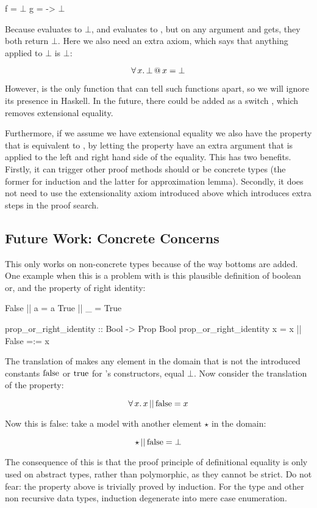 \begin{code}[mathescape]
f = $\bot$
g = \x -> $\bot$
\end{code}

Because  evaluates to $\bot$, and  evaluates
to \hs{()}, but on any argument  and  gets, they both
return $\bot$. Here we also need an extra axiom, which says that
anything applied to $\bot$ is $\bot$:

\begin{equation*}
\forall \, x . \, \bot \, @ \, x = \bot
\end{equation*}

However,  is the only function that can tell such functions
apart, so we will ignore its presence in Haskell.  In the future,
there could be added as a switch , which removes
extensional equality.

Furthermore, if we assume we have extensional equality we also have
the property that  is equivalent to
, by letting the property have an extra argument that
is applied to the left and right hand side of the equality. This has
two benefits. Firstly, it can trigger other proof methods should 
or  be concrete types (the former for induction and the latter
for approximation lemma). Secondly, it does not need to use the
extensionality axiom introduced above which introduces extra steps in
the proof search.

\subsection{Future Work: Concrete Concerns}

This only works on non-concrete types because of the way bottoms are
added. One example when this is a problem with is this plausible
definition of boolean or, and the property of right identity:

\begin{code}
False || a = a
True  || _ = True

prop_or_right_identity :: Bool -> Prop Bool
prop_or_right_identity x = x || False =:= x
\end{code}

The translation of \hs{||} makes any element in the domain that is not
the introduced constants $\mathrm{false}$ or $\mathrm{true}$ for 's
constructors, equal $\bot$. Now consider the translation of the
property:

\begin{equation*}
\forall \, x . \, x \, \mathrm{||} \, \mathrm{false} = x
\end{equation*}

Now this is false: take a model with another element $\star$ in the
domain:

$$\star \, \mathrm{||} \, \mathrm{false} = \bot$$

The consequence of this is that the proof principle of definitional
equality is only used on abstract types, rather than polymorphic, as
they cannot be strict. Do not fear: the property above is trivially
proved by induction. For the  type and other non recursive
data types, induction degenerate into mere case enumeration.


